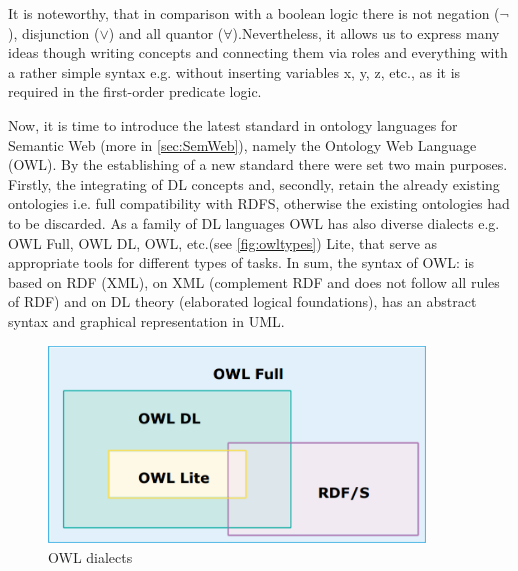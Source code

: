 		It is noteworthy, that in comparison with a boolean logic there is not negation ($\lnot$), disjunction ($\lor$) and all quantor ($\forall$).Nevertheless, it allows us to express many ideas though writing concepts and connecting them via roles and everything with a rather simple syntax e.g. without inserting variables x, y, z, etc., as it is required in the first-order predicate logic.
		
		Now, it is time to introduce the latest standard in ontology languages for Semantic Web (more in \autoref{sec:SemWeb}), namely the Ontology Web Language (OWL)\cite{owl04}. By the establishing of a new standard there were set two main purposes. Firstly, the integrating of DL concepts and, secondly, retain the already existing ontologies i.e. full compatibility with RDFS, otherwise the existing ontologies had to be discarded. As a family of DL languages OWL has also diverse dialects e.g. OWL Full, OWL DL, OWL, etc.(see \autoref{fig:owltypes}) Lite,  that serve as appropriate tools for different types of tasks. In sum, the syntax of OWL: is based on RDF (XML), on XML (complement RDF and does not follow all rules of RDF) and on DL theory (elaborated logical foundations), has an abstract syntax and graphical representation in UML.      	
		\begin{figure}
			\centering
			\includegraphics[width=10cm]{images/owltypes.PNG}
			\caption{OWL dialects \cite[lecture 8, slide 40]{Kon10}}
			\label{fig:owltypes}
		\end{figure}             
		
